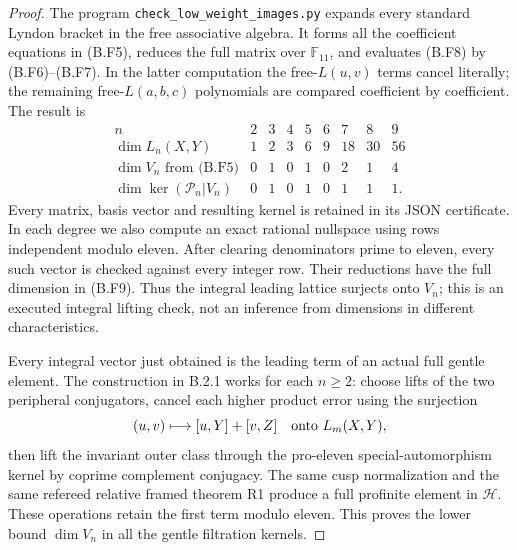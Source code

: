 \begin{proof}
The program \texttt{check\_low\_weight\_images.py} expands every
standard Lyndon bracket in the free associative algebra. It
forms all the coefficient equations in (B.F5), reduces the
full matrix over $\mathbb F_{11}$, and evaluates (B.F8) by
(B.F6)--(B.F7). In the latter computation the free-$L(u,v)$
terms cancel literally; the remaining free-$L(a,b,c)$
polynomials are compared coefficient by coefficient. The
result is
\[
\begin{array}{c|rrrrrrrr}
 n&2&3&4&5&6&7&8&9\\\hline
 \dim L_n(X,Y)&1&2&3&6&9&18&30&56\\
 \dim V_n\text{ from (B.F5)}&0&1&0&1&0&2&1&4\\
 \dim\ker(\mathcal P_n|V_n)&0&1&0&1&0&1&1&1.
\end{array}                                                 \tag{B.F9}
\]
Every matrix, basis vector and resulting kernel is retained
in its JSON certificate. In each degree we also compute an
exact rational nullspace using rows independent modulo eleven.
After clearing denominators prime to eleven, every such vector
is checked against every integer row. Their reductions have
the full dimension in (B.F9). Thus the integral leading
lattice surjects onto $V_n$; this is an executed integral
lifting check, not an inference from dimensions in different
characteristics.

Every integral vector just obtained is the leading term of
an actual full gentle element. The construction in B.2.1
works for each $n\ge2$: choose lifts of the two peripheral
conjugators, cancel each higher product error using the
surjection
\[
 (u,v)\longmapsto[u,Y]+[v,Z]\quad\hbox{onto }L_m(X,Y),
\]
then lift the invariant outer class through the pro-eleven
special-automorphism kernel by coprime complement conjugacy.
The same cusp normalization and the same refereed relative
framed theorem R1 produce a full profinite element in
$\mathcal H$. These operations retain the first term
modulo eleven. This proves the lower bound $\dim V_n$ in
all the gentle filtration kernels.


\end{proof}
